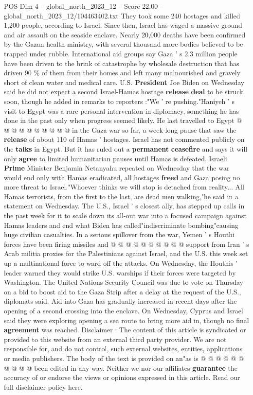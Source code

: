 \begin{textsample}{POS Dim 4 – global\_north\_2023\_12 – Score 22.00 – global\_north\_2023\_12/104463402.txt}
They took some 240 hostages and killed 1,200 people, according to Israel.
Since then, Israel has waged a massive ground and air assault on the seaside enclave.
Nearly 20,000 deaths have been confirmed by the Gazan health ministry, with several thousand more bodies believed to be trapped under rubble.
International aid groups say Gaza ' s 2.3 million people have been driven to the brink of catastrophe by wholesale destruction that has driven 90 \% of them from their homes and left many malnourished and gravely short of clean water and medical care.
U.S. \textbf{President} Joe Biden on Wednesday said he did not expect a second Israel-Hamas hostage \textbf{release} \textbf{deal} to be struck soon, though he added in remarks to reporters :"We ' re pushing."Haniyeh ' s visit to Egypt was a rare personal intervention in diplomacy, something he has done in the past only when progress seemed likely.
He last travelled to Egypt @ @ @ @ @ @ @ @ @ @ in the Gaza war so far, a week-long pause that saw the \textbf{release} of about 110 of Hamas ' hostages.
Israel has not commented publicly on the \textbf{talks} in Egypt.
But it has ruled out a \textbf{permanent} \textbf{ceasefire} and says it will only \textbf{agree} to limited humanitarian pauses until Hamas is defeated.
Israeli \textbf{Prime} Minister Benjamin Netanyahu repeated on Wednesday that the war would end only with Hamas eradicated, all hostages \textbf{freed} and Gaza posing no more threat to Israel."Whoever thinks we will stop is detached from reality...
All Hamas terrorists, from the first to the last, are dead men walking,"he said in a statement on Wednesday.
The U.S., Israel ' s closest ally, has stepped up calls in the past week for it to scale down its all-out war into a focused campaign against Hamas leaders and end what Biden has called"indiscriminate bombing"causing huge civilian casualties.
In a serious spillover from the war, Yemen ' s Houthi forces have been firing missiles and @ @ @ @ @ @ @ @ @ @ support from Iran ' s Arab militia proxies for the Palestinians against Israel, and the U.S. this week set up a multinational force to ward off the attacks.
On Wednesday, the Houthis ' leader warned they would strike U.S. warships if their forces were targeted by Washington.
The United Nations Security Council was due to vote on Thursday on a bid to boost aid to the Gaza Strip after a delay at the request of the U.S., diplomats said.
Aid into Gaza has gradually increased in recent days after the opening of a second crossing into the enclave.
On Wednesday, Cyprus and Israel said they were exploring opening a sea route to bring more aid in, though no final \textbf{agreement} was reached.
Disclaimer : The content of this article is syndicated or provided to this website from an external third party provider.
We are not responsible for, and do not control, such external websites, entities, applications or media publishers.
The body of the text is provided on an"as is @ @ @ @ @ @ @ @ @ @ been edited in any way.
Neither we nor our affiliates \textbf{guarantee} the accuracy of or endorse the views or opinions expressed in this article.
Read our full disclaimer policy here.


\end{textsample}
